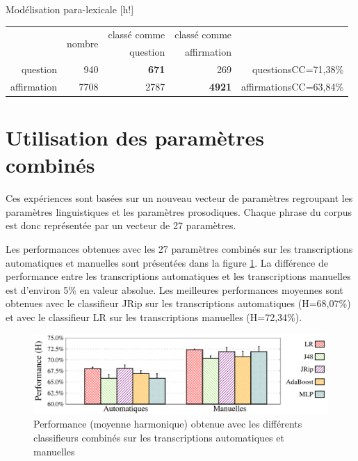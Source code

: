 \documentclass{style/these}
\makeatletter
\renewcommand\familydefault{ptm}
\renewenvironment{table}%
{ \renewcommand{\familydefault}{ptm}\selectfont
  \@float{table}}
  {\end@float}
\makeatother
\begin{document}
\begin{part}{Modélisation para-lexicale}
\begin{table}[h!]
\centering
\begin{tabular}{|r|r|r|r|r}
\cline{2-4}
\multicolumn{1}{c|}{} 	& \multirow{2}{*}{nombre}	& classé comme 	& classé comme 	& 				\\ 
\multicolumn{1}{c|}{} 	& 				& question 	& affirmation 	& 				\\ \cline{1-4} 
question		&   940				& \textbf{671}	& 269		& questionsCC=71,38\%		\\ \cline{1-4} 
affirmation		&  7708				&  2787		& \textbf{4921}	& affirmationsCC=63,84\%	\\ \cline{1-4}	
\end{tabular}
\caption{Matrice de confusion question/affirmation obtenue avec le classifieur MLP  sur les paramètres linguistiques extraits des transcriptions automatiques}
\label{Tab:l-MLP-1trial-MC}
\end{table}



\section{Utilisation des paramètres combinés}
\label{sec:comb}
\renewcommand{\rightmark}{Utilisation des paramètres combinés}

Ces expériences sont basées sur un nouveau vecteur de paramètres regroupant les paramètres linguistiques et les paramètres prosodiques. 
Chaque phrase du corpus est donc représentée par un vecteur de 27 paramètres. 

Les performances obtenues avec les 27 paramètres combinés sur les  transcriptions automatiques et manuelles sont présentées dans la figure \ref{Fig:QD-C-MvsA}. 
La différence de performance entre les transcriptions automatiques et les transcriptions manuelles est d'environ 5\% en valeur absolue. 
Les meilleures performances moyennes sont obtenues avec le classifieur JRip sur les transcriptions automatiques (H=68,07\%) et avec le  classifieur LR sur les transcriptions manuelles (H=72,34\%). 

\begin{figure}[h!]
\centering
\includegraphics[scale=0.55]{images/results/combinedClassifier_compareManualVsAutomatic.pdf}
\caption{Performance (moyenne harmonique) obtenue avec les différents classifieurs combinés sur les transcriptions automatiques et manuelles}
\label{Fig:QD-C-MvsA}
\end{figure}


\end{part}
\end{document}
